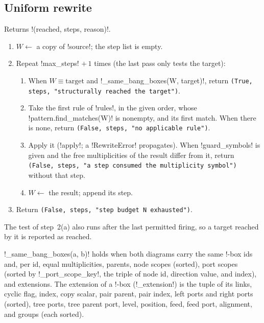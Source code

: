 \subsection{Uniform rewrite}\label{sec:kernel-tier-uniform}

\begin{algorithm}\label{alg:kernel-rewrite-to}
Returns \py!(reached, steps, reason)!.
\begin{enumerate}
\item $W\gets$ a copy of \code!source!; the step list is empty.
\item Repeat \code!max_steps! $+\,1$ times (the last pass only tests the target):
  \begin{enumerate}
  \item When $W\equiv\text{target}$ and \py!_same_bang_boxes(W, target)!, return \texttt{(\allowbreak{}True,\allowbreak{} steps,\allowbreak{} "structurally reached the target")}.
  \item Take the first rule of \code!rules!, in the given order, whose \py!pattern.find_matches(W)! is nonempty, and its first match. When there is none, return \texttt{(\allowbreak{}False,\allowbreak{} steps,\allowbreak{} "no applicable rule")}.
  \item Apply it (\py!apply!; a \py!RewriteError! propagates). When \code!guard_symbols! is given and the free multiplicities of the result differ from it, return \texttt{(\allowbreak{}False,\allowbreak{} steps,\allowbreak{} "a step consumed the multiplicity symbol")} without that step.
  \item $W\gets$ the result; append its step.
  \end{enumerate}
\item Return \texttt{(\allowbreak{}False,\allowbreak{} steps,\allowbreak{} "step budget N exhausted")}.
\end{enumerate}
The test of step~2(a) also runs after the last permitted firing, so a target reached by it is reported as reached.
\end{algorithm}

\py!_same_bang_boxes(a, b)! holds when both diagrams carry the same !-box ids and, per id, equal multiplicities, parents, node scopes (sorted), port scopes (sorted by \py!_port_scope_key!, the triple of node id, direction value, and index), and extensions. The extension of a !-box (\py!_extension!) is the tuple of its links, cyclic flag, index, copy scalar, pair parent, pair index, left ports and right ports (sorted), tree ports, tree parent port, level, position, feed, feed port, alignment, and groups (each sorted).

